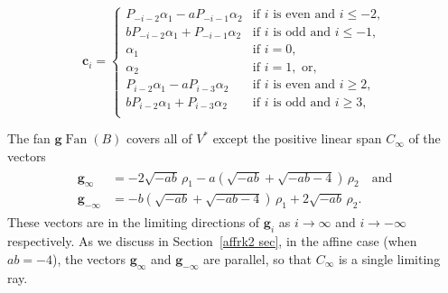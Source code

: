 \documentclass[10pt,a4paper]{amsart}
\theoremstyle{definition}
\DeclareMathOperator{\Fan}{Fan}
\newcommand{\gFan}{\g\!\Fan}
\newcommand{\g}{\mathbf{g}}
\newcommand{\cc}{\mathbf{c}}
\begin{document}
\begin{equation}\label{ba cs} 
\cc_i=\begin{cases}
P_{-i-2}\alpha_1-aP_{-i-1}\alpha_2&\text{if }i\text{ is even and }i\le-2,\\
bP_{-i-2}\alpha_1+P_{-i-1}\alpha_2&\text{if }i\text{ is odd and }i\le-1,\\
\alpha_1&\text{if }i=0,\\
\alpha_2&\text{if }i=1,\text{ or},\\
P_{i-2}\alpha_1-aP_{i-3}\alpha_2&\text{if }i\text{ is even and }i\ge2,\\
bP_{i-2}\alpha_1+P_{i-3}\alpha_2&\text{if }i\text{ is odd and }i\ge3,\\
\end{cases}
\end{equation}

The fan $\gFan(B)$ covers all of $V^*$ except the positive linear span $C_\infty$ of the vectors 
\begin{align}
\begin{split}
\g_\infty&=-2\sqrt{-ab}\,\rho_1-a(\sqrt{-ab}+\sqrt{-ab-4})\,\rho_2\quad\text{and}\\
\g_{-\infty}&=-b(\sqrt{-ab}+\sqrt{-ab-4})\,\rho_1+2\sqrt{-ab}\,\rho_2.
\end{split}
\end{align}
These vectors are in the limiting directions of $\g_i$ as $i\to\infty$ and $i\to-\infty$ respectively.
As we discuss in Section~\ref{affrk2 sec}, in the affine case (when $ab=-4$), the vectors $\g_\infty$ and $\g_{-\infty}$ are parallel, so that $C_\infty$ is a single limiting ray.
\end{document}
